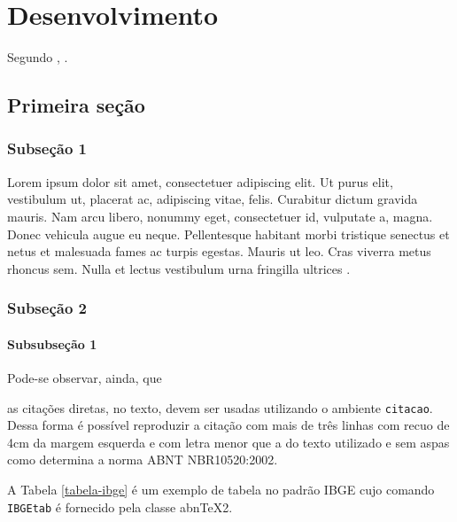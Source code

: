 %

\chapter{Desenvolvimento}
Segundo , \lipsum[2].

\section{Primeira seção}
\lipsum[4]

\subsection{Subseção 1}
Lorem ipsum dolor sit amet, consectetuer adipiscing elit. Ut purus elit, vestibulum ut, placerat ac,
adipiscing vitae, felis. Curabitur dictum gravida mauris. Nam arcu libero, nonummy eget, consectetuer
id, vulputate a, magna. Donec vehicula augue eu neque. Pellentesque habitant morbi tristique senectus
et netus et malesuada fames ac turpis egestas. Mauris ut leo. Cras viverra metus rhoncus sem. Nulla
et lectus vestibulum urna fringilla ultrices \cite{2007_montebelo}.

\subsection{Subseção 2}
\lipsum[3]

\subsubsection{Subsubseção 1}
Pode-se observar, ainda, que
\begin{citacao}
	as citações diretas, no texto, devem ser usadas utilizando o ambiente \texttt{citacao}. Dessa forma é possível reproduzir a citação com mais de três linhas com recuo de 4cm da margem esquerda e com letra menor que a do texto utilizado e sem aspas como determina a norma ABNT NBR10520:2002.
\end{citacao}

\lipsum[2]

A Tabela \ref{tabela-ibge} é um exemplo de tabela no padrão IBGE cujo comando \texttt{IBGEtab} é fornecido pela classe abnTeX2.
\begin{table}[htb]
\end{table}
